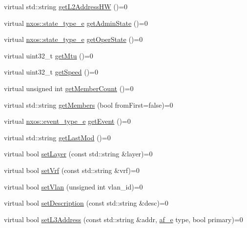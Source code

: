 \begin{DoxyCompactItemize}
\item 
virtual std\+::string \mbox{\hyperlink{classnxos_1_1_nx_intf_a2c057f3f9691205712f70aea8c46f639}{get\+L2\+Address\+HW}} ()=0
\item 
virtual \mbox{\hyperlink{nx__common_8h_a7c257059d03188765435b36e95dbb764}{nxos\+::state\+\_\+type\+\_\+e}} \mbox{\hyperlink{classnxos_1_1_nx_intf_a161d3222b8e6f5dff510eef2406996fb}{get\+Admin\+State}} ()=0
\item 
virtual \mbox{\hyperlink{nx__common_8h_a7c257059d03188765435b36e95dbb764}{nxos\+::state\+\_\+type\+\_\+e}} \mbox{\hyperlink{classnxos_1_1_nx_intf_abd5291d975d3193c3603efd7ec17deda}{get\+Oper\+State}} ()=0
\item 
virtual uint32\+\_\+t \mbox{\hyperlink{classnxos_1_1_nx_intf_ae0b1d1c5fed67948cb0bbb9040a8f4de}{get\+Mtu}} ()=0
\item 
virtual uint32\+\_\+t \mbox{\hyperlink{classnxos_1_1_nx_intf_ac1fdcdff8093c76a11b06951d2673356}{get\+Speed}} ()=0
\item 
virtual unsigned int \mbox{\hyperlink{classnxos_1_1_nx_intf_a21f7c1b00f609f61ac2d8b68abea1f77}{get\+Member\+Count}} ()=0
\item 
virtual std\+::string \mbox{\hyperlink{classnxos_1_1_nx_intf_a7c197b62e8135c8b78aa8fbf8958f9a2}{get\+Members}} (bool from\+First=false)=0
\item 
virtual \mbox{\hyperlink{nx__common_8h_af9a9040b7681199d386e94eb888018cb}{nxos\+::event\+\_\+type\+\_\+e}} \mbox{\hyperlink{classnxos_1_1_nx_intf_a148d8b41d613478294179277a03f3aeb}{get\+Event}} ()=0
\item 
virtual std\+::string \mbox{\hyperlink{classnxos_1_1_nx_intf_aa431b02d46df5e7822fdd0c7a19d93ab}{get\+Last\+Mod}} ()=0
\item 
virtual bool \mbox{\hyperlink{classnxos_1_1_nx_intf_a20e5e820227e592874bf155573e3e700}{set\+Layer}} (const std\+::string \&layer)=0
\item 
virtual bool \mbox{\hyperlink{classnxos_1_1_nx_intf_a91343eb99de8391f1a0e06646ae13b5e}{set\+Vrf}} (const std\+::string \&vrf)=0
\item 
virtual bool \mbox{\hyperlink{classnxos_1_1_nx_intf_af5d5c584845fe42bea0d1d40f9907065}{set\+Vlan}} (unsigned int vlan\+\_\+id)=0
\item 
virtual bool \mbox{\hyperlink{classnxos_1_1_nx_intf_aaaa5e4a9b9161b2908eb9c7979e96f8e}{set\+Description}} (const std\+::string \&desc)=0
\item 
virtual bool \mbox{\hyperlink{classnxos_1_1_nx_intf_a9ff78e595e9d16ab1eca675daa98c34e}{set\+L3\+Address}} (const std\+::string \&addr, \mbox{\hyperlink{nx__common_8h_a3a667f48b94db10aa398940dc5bf72d7}{af\+\_\+e}} type, bool primary)=0

\end{DoxyCompactItemize}
